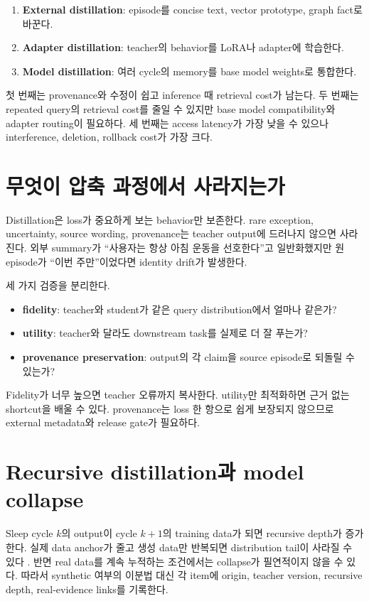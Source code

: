 \begin{enumerate}
  \item \textbf{External distillation}: episode를 concise text, vector prototype, graph fact로 바꾼다.
  \item \textbf{Adapter distillation}: teacher의 behavior를 LoRA나 adapter에 학습한다.
  \item \textbf{Model distillation}: 여러 cycle의 memory를 base model weights로 통합한다.
\end{enumerate}

첫 번째는 provenance와 수정이 쉽고 inference 때 retrieval cost가 남는다. 두 번째는 repeated
query의 retrieval cost를 줄일 수 있지만 base model compatibility와 adapter routing이 필요하다.
세 번째는 access latency가 가장 낮을 수 있으나 interference, deletion, rollback cost가 가장
크다.

\section{무엇이 압축 과정에서 사라지는가}

Distillation은 loss가 중요하게 보는 behavior만 보존한다. rare exception, uncertainty,
source wording, provenance는 teacher output에 드러나지 않으면 사라진다. 외부 summary가
``사용자는 항상 아침 운동을 선호한다''고 일반화했지만 원 episode가 ``이번 주만''이었다면
identity drift가 발생한다.

세 가지 검증을 분리한다.

\begin{itemize}
  \item \textbf{fidelity}: teacher와 student가 같은 query distribution에서 얼마나 같은가?
  \item \textbf{utility}: teacher와 달라도 downstream task를 실제로 더 잘 푸는가?
  \item \textbf{provenance preservation}: output의 각 claim을 source episode로 되돌릴 수 있는가?
\end{itemize}

Fidelity가 너무 높으면 teacher 오류까지 복사한다. utility만 최적화하면 근거 없는 shortcut을
배울 수 있다. provenance는 loss 한 항으로 쉽게 보장되지 않으므로 external metadata와
release gate가 필요하다.

\section{Recursive distillation과 model collapse}

Sleep cycle $k$의 output이 cycle $k+1$의 training data가 되면 recursive depth가 증가한다.
실제 data anchor가 줄고 생성 data만 반복되면 distribution tail이 사라질 수 있다
\parencite{shumailov2024collapse}. 반면 real data를 계속 누적하는 조건에서는 collapse가
필연적이지 않을 수 있다. 따라서 synthetic 여부의 이분법 대신 각 item에
origin, teacher version, recursive depth, real-evidence links를 기록한다.

